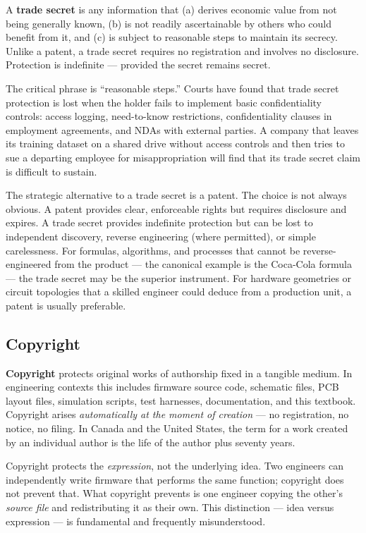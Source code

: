 A \textbf{trade secret} is any information that (a) derives
economic value from not being generally known, (b) is not readily ascertainable
by others who could benefit from it, and (c) is subject to reasonable steps to
maintain its secrecy.
Unlike a patent, a trade secret requires no registration and involves no
disclosure.
Protection is indefinite --- provided the secret remains secret.

The critical phrase is ``reasonable steps.''
Courts have found that trade secret protection is lost when the holder fails to
implement basic confidentiality controls: access logging, need-to-know
restrictions, confidentiality clauses in employment agreements, and NDAs with
external parties.
A company that leaves its training dataset on a shared drive without access
controls and then tries to sue a departing employee for misappropriation will find
that its trade secret claim is difficult to sustain.

The strategic alternative to a trade secret is a patent.
The choice is not always obvious.
A patent provides clear, enforceable rights but requires disclosure and expires.
A trade secret provides indefinite protection but can be lost to independent
discovery, reverse engineering (where permitted), or simple carelessness.
For formulas, algorithms, and processes that cannot be reverse-engineered from
the product --- the canonical example is the Coca-Cola formula --- the trade
secret may be the superior instrument.
For hardware geometries or circuit topologies that a skilled engineer could deduce
from a production unit, a patent is usually preferable.

\subsection{Copyright}
\label{subsec:ch15-copyright}

\textbf{Copyright} protects original works of authorship fixed
in a tangible medium.
In engineering contexts this includes firmware source code, schematic files, PCB
layout files, simulation scripts, test harnesses, documentation, and this
textbook.
Copyright arises \emph{automatically at the moment of creation} --- no
registration, no notice, no filing.
In Canada and the United States, the term for a work created by an individual
author is the life of the author plus seventy years.

Copyright protects the \emph{expression}, not the underlying idea.
Two engineers can independently write firmware that performs the same function;
copyright does not prevent that.
What copyright prevents is one engineer copying the other's \emph{source file}
and redistributing it as their own.
This distinction --- idea versus expression --- is fundamental and frequently
misunderstood.

